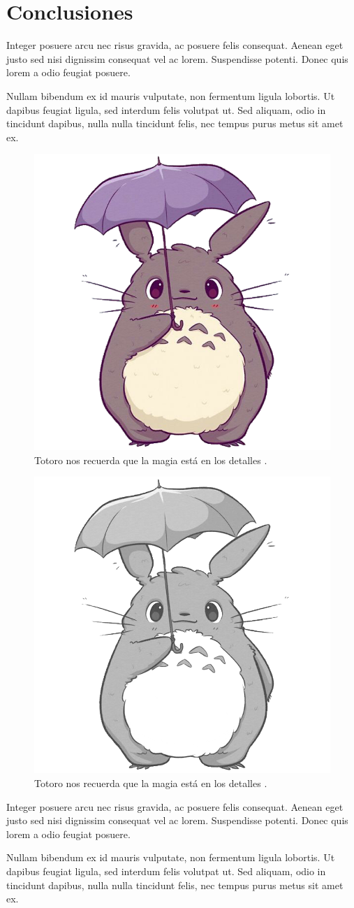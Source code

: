 \section{Conclusiones}

Integer posuere arcu nec risus gravida, ac posuere felis consequat. Aenean eget justo sed nisi dignissim consequat vel ac lorem. Suspendisse potenti. Donec quis lorem a odio feugiat posuere.

Nullam bibendum ex id mauris vulputate, non fermentum ligula lobortis. Ut dapibus feugiat ligula, sed interdum felis volutpat ut. Sed aliquam, odio in tincidunt dapibus, nulla nulla tincidunt felis, nec tempus purus metus sit amet ex.

\ifPDF
\begin{figure}[!ht]
\centering
\includegraphics[width=.5\textwidth]{./media/avatar.png}
\caption{Totoro nos recuerda que la magia está en los detalles \parencite{@6404-HAYAO2005}.}\label{figura3-1}
\end{figure}
	\else
	\ifBNPDF
	\begin{figure}[!ht]
	\centering
	\includegraphics[width=.5\textwidth]{./media/avatar2.png}
	\caption{Totoro nos recuerda que la magia está en los detalles \parencite{@6404-HAYAO2005}.}\label{figura3-1}
	\end{figure}
	\fi
\fi

Integer posuere arcu nec risus gravida, ac posuere felis consequat. Aenean eget justo sed nisi dignissim consequat vel ac lorem. Suspendisse potenti. Donec quis lorem a odio feugiat posuere.

Nullam bibendum ex id mauris vulputate, non fermentum ligula lobortis. Ut dapibus feugiat ligula, sed interdum felis volutpat ut. Sed aliquam, odio in tincidunt dapibus, nulla nulla tincidunt felis, nec tempus purus metus sit amet ex.

